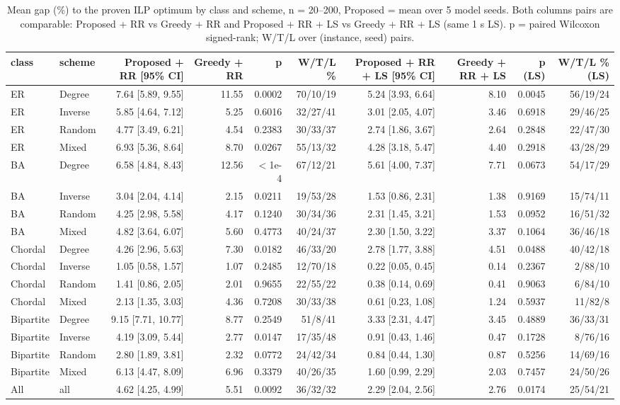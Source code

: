 \begin{table}[t]
\centering
\caption{Mean gap (\%) to the proven ILP optimum by class and scheme, n = 20--200, Proposed = mean over 5 model seeds. Both columns pairs are comparable: Proposed + RR vs Greedy + RR and Proposed + RR + LS vs Greedy + RR + LS (same 1 s LS). p = paired Wilcoxon signed-rank; W/T/L over (instance, seed) pairs.}
\label{tab:table3_fair}
\scriptsize
\begin{tabular}{llrrrrrrrr}
\toprule
class & scheme & Proposed + RR [95\% CI] & Greedy + RR & p & W/T/L \% & Proposed + RR + LS [95\% CI] & Greedy + RR + LS & p (LS) & W/T/L \% (LS) \\
\midrule
ER & Degree & 7.64 [5.89, 9.55] & 11.55 & 0.0002 & 70/10/19 & 5.24 [3.93, 6.64] & 8.10 & 0.0045 & 56/19/24 \\
ER & Inverse & 5.85 [4.64, 7.12] & 5.25 & 0.6016 & 32/27/41 & 3.01 [2.05, 4.07] & 3.46 & 0.6918 & 29/46/25 \\
ER & Random & 4.77 [3.49, 6.21] & 4.54 & 0.2383 & 30/33/37 & 2.74 [1.86, 3.67] & 2.64 & 0.2848 & 22/47/30 \\
ER & Mixed & 6.93 [5.36, 8.64] & 8.70 & 0.0267 & 55/13/32 & 4.28 [3.18, 5.47] & 4.40 & 0.2918 & 43/28/29 \\
BA & Degree & 6.58 [4.84, 8.43] & 12.56 & $<$1e-4 & 67/12/21 & 5.61 [4.00, 7.37] & 7.71 & 0.0673 & 54/17/29 \\
BA & Inverse & 3.04 [2.04, 4.14] & 2.15 & 0.0211 & 19/53/28 & 1.53 [0.86, 2.31] & 1.38 & 0.9169 & 15/74/11 \\
BA & Random & 4.25 [2.98, 5.58] & 4.17 & 0.1240 & 30/34/36 & 2.31 [1.45, 3.21] & 1.53 & 0.0952 & 16/51/32 \\
BA & Mixed & 4.82 [3.64, 6.07] & 5.60 & 0.4773 & 40/24/37 & 2.30 [1.50, 3.22] & 3.37 & 0.1064 & 36/46/18 \\
Chordal & Degree & 4.26 [2.96, 5.63] & 7.30 & 0.0182 & 46/33/20 & 2.78 [1.77, 3.88] & 4.51 & 0.0488 & 40/42/18 \\
Chordal & Inverse & 1.05 [0.58, 1.57] & 1.07 & 0.2485 & 12/70/18 & 0.22 [0.05, 0.45] & 0.14 & 0.2367 & 2/88/10 \\
Chordal & Random & 1.41 [0.86, 2.05] & 2.01 & 0.9655 & 22/55/22 & 0.38 [0.14, 0.69] & 0.41 & 0.9063 & 6/84/10 \\
Chordal & Mixed & 2.13 [1.35, 3.03] & 4.36 & 0.7208 & 30/33/38 & 0.61 [0.23, 1.08] & 1.24 & 0.5937 & 11/82/8 \\
Bipartite & Degree & 9.15 [7.71, 10.77] & 8.77 & 0.2549 & 51/8/41 & 3.33 [2.31, 4.47] & 3.45 & 0.4889 & 36/33/31 \\
Bipartite & Inverse & 4.19 [3.09, 5.44] & 2.77 & 0.0147 & 17/35/48 & 0.91 [0.43, 1.46] & 0.47 & 0.1728 & 8/76/16 \\
Bipartite & Random & 2.80 [1.89, 3.81] & 2.32 & 0.0772 & 24/42/34 & 0.84 [0.44, 1.30] & 0.87 & 0.5256 & 14/69/16 \\
Bipartite & Mixed & 6.13 [4.47, 8.09] & 6.96 & 0.3379 & 40/26/35 & 1.60 [0.99, 2.29] & 2.03 & 0.7457 & 24/50/26 \\
All & all & 4.62 [4.25, 4.99] & 5.51 & 0.0092 & 36/32/32 & 2.29 [2.04, 2.56] & 2.76 & 0.0174 & 25/54/21 \\
\bottomrule
\end{tabular}
\end{table}
